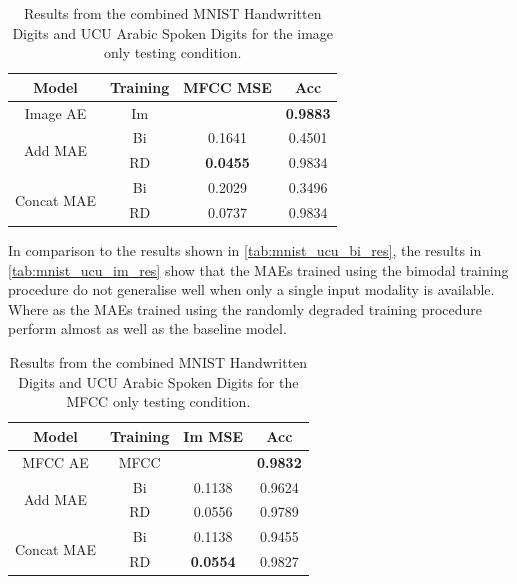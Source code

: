\begin{table}
	\centering
		\begin{tabular}{|c|c|c|c|}
		\hline
		Model & Training &  MFCC MSE &  Acc \\ \hline
		Image AE & Im 		&  		    			& \textbf{0.9883}	\\ \hline		
\multirow{2}{*}{Add MAE} & Bi & 	0.1641			& 0.4501 			\\ \cline{2-4}
						  & RD & \textbf{0.0455}	& 0.9834 			\\ \hline	
		
\multirow{2}{*}{Concat MAE} & Bi & 	0.2029		&	0.3496 			\\ \cline{2-4}		
							 & RD & 	0.0737		&	0.9834 			\\ \hline
		\end{tabular}
		\caption{Results from the combined MNIST Handwritten Digits and UCU Arabic Spoken Digits for the image only testing condition.}
		\label{tab:mnist_ucu_im_res}

\end{table}

In comparison to the results shown in \autoref{tab:mnist_ucu_bi_res}, the results in \autoref{tab:mnist_ucu_im_res} show that the MAEs trained using the bimodal training procedure do not generalise well when only a single input modality is available. Where as the MAEs trained using the randomly degraded training procedure perform almost as well as the baseline model. 
\begin{table}
	\centering
		\begin{tabular}{|c|c|c|c|}
		\hline
		Model & Training & Im MSE &  Acc \\ \hline
				
				MFCC AE & MFCC & 					& 	\textbf{0.9832}	\\ \hline		
\multirow{2}{*}{Add MAE} & Bi & 	0.1138			& 	0.9624 			\\ \cline{2-4}
						  & RD &	0.0556			&	0.9789			\\ \hline	
		
\multirow{2}{*}{Concat MAE} & Bi &	0.1138			&	0.9455			\\ \cline{2-4}		
							 & RD & \textbf{0.0554}	& 	0.9827 			\\ \hline
		\end{tabular}
		\caption{Results from the combined MNIST Handwritten Digits and UCU Arabic Spoken Digits for the MFCC only testing condition.}
		\label{tab:mnist_ucu_mfcc_res}

\end{table}

